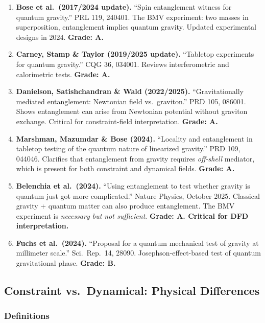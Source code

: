 \documentclass[11pt,a4paper]{article}
\begin{document}
\begin{enumerate}
\item \textbf{Bose et al.\ (2017/2024 update).} ``Spin entanglement witness for quantum gravity.'' PRL 119, 240401. The BMV experiment: two masses in superposition, entanglement implies quantum gravity. Updated experimental designs in 2024. \textbf{Grade: A.}

\item \textbf{Carney, Stamp \& Taylor (2019/2025 update).} ``Tabletop experiments for quantum gravity.'' CQG 36, 034001. Reviews interferometric and calorimetric tests. \textbf{Grade: A.}

\item \textbf{Danielson, Satishchandran \& Wald (2022/2025).} ``Gravitationally mediated entanglement: Newtonian field vs.\ graviton.'' PRD 105, 086001. Shows entanglement can arise from Newtonian potential without graviton exchange. Critical for constraint-field interpretation. \textbf{Grade: A.}

\item \textbf{Marshman, Mazumdar \& Bose (2024).} ``Locality and entanglement in tabletop testing of the quantum nature of linearized gravity.'' PRD 109, 044046. Clarifies that entanglement from gravity requires \emph{off-shell} mediator, which is present for both constraint and dynamical fields. \textbf{Grade: A.}

\item \textbf{Belenchia et al.\ (2024).} ``Using entanglement to test whether gravity is quantum just got more complicated.'' Nature Physics, October 2025. Classical gravity + quantum matter can also produce entanglement. The BMV experiment is \emph{necessary but not sufficient}. \textbf{Grade: A. Critical for DFD interpretation.}

\item \textbf{Fuchs et al.\ (2024).} ``Proposal for a quantum mechanical test of gravity at millimeter scale.'' Sci.\ Rep.\ 14, 28090. Josephson-effect-based test of quantum gravitational phase. \textbf{Grade: B.}
\end{enumerate}

\subsection{Constraint vs.\ Dynamical: Physical Differences}

\subsubsection{Definitions}
\end{document}

